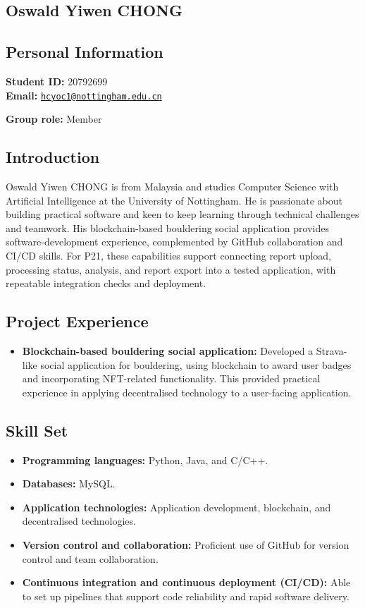 \documentclass[a4paper,12pt]{article}
\newcommand{\PersonalInformation}[2]{%
  \subsection*{Personal Information}
  \if\relax\detokenize{#1}\relax\else
  \noindent\textbf{Student ID:} #1\\
  \fi
  \textbf{Email:} #2\par
}
\begin{document}
\subsection{Oswald Yiwen CHONG}
\PersonalInformation{20792699}{\href{mailto:hcyoc1@nottingham.edu.cn}{\nolinkurl{hcyoc1@nottingham.edu.cn}}}
\noindent\textbf{Group role:} Member\par

\subsection*{Introduction}
Oswald Yiwen CHONG is from Malaysia and studies Computer Science with Artificial Intelligence at the University of Nottingham. He is passionate about building practical software and keen to keep learning through technical challenges and teamwork. His blockchain-based bouldering social application provides software-development experience, complemented by GitHub collaboration and CI/CD skills. For P21, these capabilities support connecting report upload, processing status, analysis, and report export into a tested application, with repeatable integration checks and deployment.

\subsection*{Project Experience}
\begin{itemize}
  \item \textbf{Blockchain-based bouldering social application:} Developed a Strava-like social application for bouldering, using blockchain to award user badges and incorporating NFT-related functionality. This provided practical experience in applying decentralised technology to a user-facing application.
\end{itemize}

\subsection*{Skill Set}
\begin{itemize}
  \item \textbf{Programming languages:} Python, Java, and C/C++.
  \item \textbf{Databases:} MySQL.
  \item \textbf{Application technologies:} Application development, blockchain, and decentralised technologies.
  \item \textbf{Version control and collaboration:} Proficient use of GitHub for version control and team collaboration.
  \item \textbf{Continuous integration and continuous deployment (CI/CD):} Able to set up pipelines that support code reliability and rapid software delivery.
\end{itemize}
\end{document}
